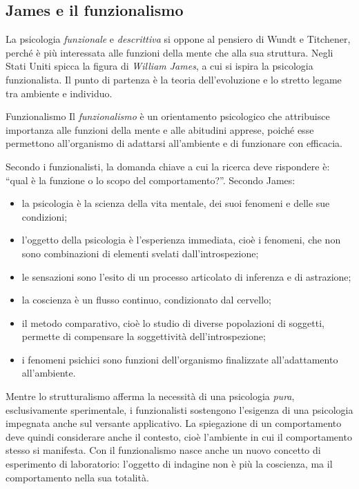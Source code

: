 \documentclass[a4paper]{article}
\begin{document}
\subsection{James e il funzionalismo}
La psicologia \emph{funzionale} e \emph{descrittiva} si oppone al pensiero di Wundt e Titchener, perché è più interessata alle funzioni della mente che alla sua struttura.
Negli Stati Uniti spicca la figura di \emph{William James}, a cui si ispira la psicologia funzionalista. Il punto di partenza è la teoria dell'evoluzione e lo stretto legame tra ambiente e individuo.
\begin{snippetdefinition}{Funzionalismo}
    Il \emph{funzionalismo} è un orientamento psicologico che attribuisce importanza alle funzioni della mente e alle abitudini apprese, poiché esse permettono all'organismo di adattarsi all'ambiente e di funzionare con efficacia.
\end{snippetdefinition}
Secondo i funzionalisti, la domanda chiave a cui la ricerca deve rispondere è: ``qual è la funzione o lo scopo del comportamento?''.
Secondo James:
\begin{itemize}
    \item la psicologia è la scienza della vita mentale, dei suoi fenomeni e delle sue condizioni;
    \item l'oggetto della psicologia è l'esperienza immediata, cioè i fenomeni, che non sono combinazioni di elementi svelati dall'introspezione;
    \item le sensazioni sono l'esito di un processo articolato di inferenza e di astrazione;
    \item la coscienza è un flusso continuo, condizionato dal cervello;
    \item il metodo comparativo, cioè lo studio di diverse popolazioni di soggetti, permette di compensare la soggettività dell'introspezione;
    \item i fenomeni psichici sono funzioni dell'organismo finalizzate all'adattamento all'ambiente.
\end{itemize}
Mentre lo strutturalismo afferma la necessità di una psicologia \emph{pura}, esclusivamente sperimentale, i funzionalisti sostengono l'esigenza di una psicologia impegnata anche sul versante applicativo. La spiegazione di un comportamento deve quindi considerare anche il contesto, cioè l'ambiente in cui il comportamento stesso si manifesta.
Con il funzionalismo nasce anche un nuovo concetto di esperimento di laboratorio: l'oggetto di indagine non è più la coscienza, ma il comportamento nella sua totalità.
\end{document}
